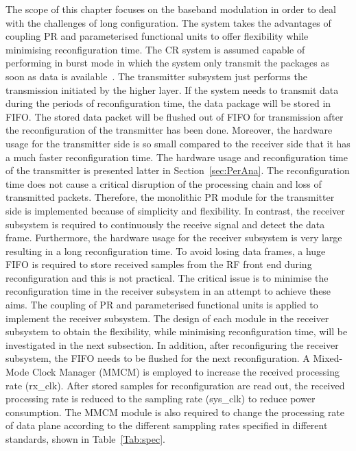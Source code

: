 The scope of this chapter focuses on the baseband modulation in order to deal with the challenges of long configuration. 
The system takes the advantages of coupling PR and parameterised functional units to offer flexibility while minimising reconfiguration time.
The CR system is assumed capable of performing in burst mode in which the system only transmit the packages as soon as data is available~\cite{Ai2006}.
The transmitter subsystem just performs the transmission initiated by the higher layer.
If the system needs to transmit data during the periods of reconfiguration time, the data package will be stored in FIFO. 
The stored data packet will be flushed out of FIFO for transmission after the reconfiguration of the transmitter has been done.
Moreover, the hardware usage for the transmitter side is so small compared to the receiver side that it has a much faster reconfiguration time.
The hardware usage and reconfiguration time of the transmitter is presented latter in Section~\ref{sec:PerAna}.
The reconfiguration time does not cause a critical disruption of the processing chain and loss of transmitted packets.
Therefore, the monolithic PR module for the transmitter side is implemented because of simplicity and flexibility.
In contrast, the receiver subsystem is required to continuously the receive signal and detect the data frame.
Furthermore, the hardware usage for the receiver subsystem is very large resulting in a long reconfiguration time.
To avoid losing data frames, a huge FIFO is required to store received samples from the RF front end during reconfiguration and this is not practical.
The critical  issue is to minimise the reconfiguration time in the receiver subsystem in an attempt to achieve these aims.
The coupling of PR and parameterised functional units is applied to implement the receiver subsystem. 
The design of each module in the receiver subsystem to obtain the flexibility, while minimising reconfiguration time, will be investigated in the next subsection.
In addition, after reconfiguring the receiver subsystem, the FIFO needs to be flushed for the next reconfiguration. 
A Mixed-Mode Clock Manager (MMCM) is employed to increase the received processing rate (rx\_clk).
After stored samples for reconfiguration are read out, the received processing rate is reduced to the sampling rate (sys\_clk) to reduce power consumption.
The MMCM module is also required to change the processing rate of data plane according to the different samppling rates specified in different standards, shown in Table~\ref{Tab:spec}.

